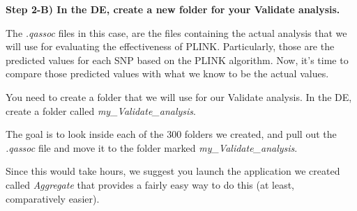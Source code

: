 \documentclass[twoside,a4paper]{refart}
\begin{document}
\newpage
\begin{center}
\end{center}

\textbf{Step 2-B) In the DE, create a new folder for your Validate analysis.}

The \textit{.qassoc} files in this case, are the files containing the actual analysis that we will use for evaluating the effectiveness of PLINK. Particularly, those are the predicted values for each SNP based on the PLINK algorithm. Now, it's time to compare those predicted values with what we know to be the actual values. 

You need to create a folder that we will use for our Validate analysis. In the DE, create a folder called \textit{my\_Validate\_analysis}. 

The goal is to look inside each of the 300 folders we created, and pull out the \textit{.qassoc} file and move it to the folder marked \textit{my\_Validate\_analysis}. 

Since this would take hours, we suggest you launch the application we created called \textit{Aggregate} that provides a fairly easy way to do this (at least, comparatively easier). 
\end{document}
